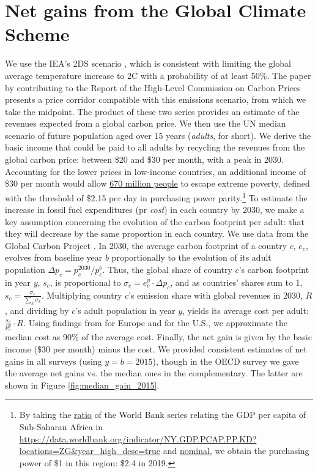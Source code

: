 \clearpage
\section{Net gains from the Global Climate Scheme}\label{app:gain_gcs}

We use the IEA's 2DS scenario \citep{iea_energy_2017}, which is consistent with limiting the global average temperature increase to 2\textdegree{}C with a probability of at least 50\%. The paper by \citet{hood_input_2017} contributing to the Report of the High-Level Commission on Carbon Prices \citep{stern_report_2017} presents a price corridor compatible with this emissions scenario, from which we take the midpoint. The product of these two series provides an estimate of the revenues expected from a global carbon price. We then use the UN median scenario of future population aged over 15 years (\textit{adults}, for short). We derive the basic income that could be paid to all adults by recycling the revenues from the global carbon price: between \$20 and \$30 per month, with a peak in 2030. Accounting for the lower prices in low-income countries, an additional income of \$30 per month would allow \href{https://data.worldbank.org/indicator/SI.POV.DDAY}{670 million people} to escape extreme poverty, defined with the threshold of \$2.15 per day in purchasing power parity.\footnote{By taking the \href{https://data.worldbank.org/indicator/PA.NUS.PPPC.RF}{ratio} of the World Bank series relating the GDP per capita of Sub-Saharan Africa in \href{PPP}{https://data.worldbank.org/indicator/NY.GDP.PCAP.PP.KD?locations=ZG&year_high_desc=true} and \href{https://data.worldbank.org/indicator/NY.GDP.PCAP.KD?locations=ZG&year_high_desc=true}{nominal}, we obtain the purchasing power of \$1 in this region: \$2.4 in 2019. %
} 
To estimate the increase in fossil fuel expenditures (pr \textit{cost}) in each country by 2030, we make a key assumption concerning the evolution of the carbon footprint per adult: that they will decrease by the same proportion in each country. We use data from the Global Carbon Project \citep{peters_synthesis_2012}. In 2030, the average carbon footprint of a country $c$, $e_c$, evolves from baseline year $b$ proportionally to the evolution of its adult population $\Delta p_c = p^2030_c/p^b_c$. Thus, the global share of country $c$'s carbon footprint in year $y$, $s_c$, is proportional to $\sigma_c = e^y_c\cdot \Delta p_c$, and as countries' shares sum to 1, $s_c = \frac{\sigma_c}{\sum_k \sigma_k}$. Multiplying country $c$'s emission share with global revenues in 2030, $R$, and dividing by $c$'s adult population in year $y$, yields its average cost per adult: $\frac{s_c}{p^y_c} \cdot R$. Using findings from \citet{ivanova_unequal_2020} for Europe and \citet{fremstad_impact_2019} for the U.S., we approximate the median cost as 90\% of the average cost. Finally, the net gain is given by the basic income (\$30 per month) minus the cost. We provided consistent estimates of net gains in all surveys (using $y = b = 2015$), though in the OECD survey we gave the average net gains vs. the median ones in the complementary. The latter are shown in Figure \ref{fig:median_gain_2015}. 
